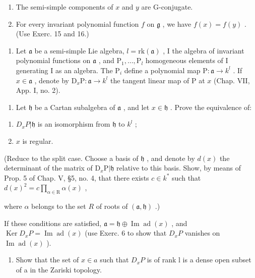 \begin{enumerate}
\def\labelenumi{(\roman{enumi})}
\item
  The semi-simple components of \(x\) and \(y\) are G-conjugate.
\item
  For every invariant polynomial function \(f\) on \(\mathfrak{g}\) , we have \(f(x) = f(y)\) . (Use Exerc. 15 and 16.)
\end{enumerate}

\begin{enumerate}
\def\labelenumi{\arabic{enumi})}
\setcounter{enumi}{17}
\tightlist
\item
  Let \(\mathfrak{a}\) be a semi-simple Lie algebra, \(l = \mathrm{rk}(\mathfrak{a})\) , I the algebra of invariant polynomial functions on \(\mathfrak{a}\) , and \(\mathrm{P}_1, \ldots, \mathrm{P}_l\) homogeneous elements of I generating I as an algebra. The \(\mathrm{P}_i\) define a polynomial map \(\mathrm{P} : \mathfrak{a} \to k^l\) . If \(x \in \mathfrak{a}\) , denote by \(\mathrm{D}_x\mathrm{P} : \mathfrak{a} \to k^l\) the tangent linear map of P at \(x\) (Chap. VII, App. I, no. 2).
\end{enumerate}

\begin{enumerate}
\def\labelenumi{\alph{enumi})}
\tightlist
\item
  Let \(\mathfrak{h}\) be a Cartan subalgebra of \(\mathfrak{a}\) , and let \(x \in \mathfrak{h}\) . Prove the equivalence of:
\end{enumerate}

\begin{enumerate}
\def\labelenumi{(\roman{enumi})}
\item
  \(D_{x}P|\mathfrak{h}\) is an isomorphism from \(\mathfrak{h}\) to \(k^{l}\) ;
\item
  \(x\) is regular.
\end{enumerate}

(Reduce to the split case. Choose a basis of \(\mathfrak{h}\) , and denote by \(d(x)\) the determinant of the matrix of \(\mathrm{D}_x\mathrm{P}|\mathfrak{h}\) relative to this basis. Show, by means of Prop. 5 of Chap. V, §5, no. 4, that there exists \(c \in k^*\) such that \(d(x)^2 = c \prod_{\alpha \in \mathrm{R}} \alpha(x)\) ,

where \(\alpha\) belongs to the set \(R\) of roots of \((\mathfrak{a},\mathfrak{h})\) .)

If these conditions are satisfied, \(\mathfrak{a} = \mathfrak{h} \oplus \operatorname{Im} \operatorname{ad}(x)\) , and \(\operatorname{Ker} D_x P = \operatorname{Im} \operatorname{ad}(x)\) (use Exerc. 6 to show that \(D_x P\) vanishes on \(\operatorname{Im} \operatorname{ad}(x)\) ).

\begin{enumerate}
\def\labelenumi{\alph{enumi})}
\setcounter{enumi}{1}
\tightlist
\item
  Show that the set of \(x \in a\) such that \(D_{x}P\) is of rank l is a dense open subset of a in the Zariski topology.
\end{enumerate}

